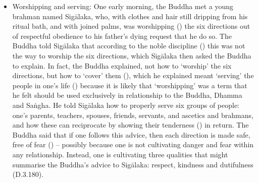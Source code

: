\begin{itemize}
\item Worshipping and serving: One early morning, the Buddha met a young brahman named Sigālaka, who, with clothes and hair still dripping from his ritual bath, and with joined palms, was worshipping () the six directions out of respectful obedience to his father's dying request that he do so. The Buddha told Sigālaka that according to the noble discipline () this was not the way to worship the six directions, which Sigālaka then asked the Buddha to explain. In fact, the Buddha explained, not how to `worship' the six directions, but how to `cover' them (), which he explained meant `serving' the people in one's life () because it is likely that `worshipping' was a term that he felt should be used exclusively in relationship to the Buddha, Dhamma and Sa\.ngha. He told Sigālaka how to properly serve six groups of people: one's parents, teachers, spouses, friends, servants, and ascetics and brahmans, and how these can reciprocate by showing their tenderness () in return. The Buddha said that if one follows this advice, then each direction is made safe, free of fear () -- possibly because one is not cultivating danger and fear within any relationship. Instead, one is cultivating three qualities that might summarise the Buddha's advice to Sigālaka: respect, kindness and dutifulness (D.3.180).


\end{itemize}

